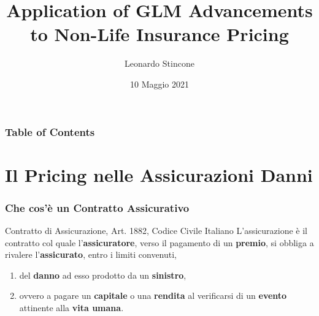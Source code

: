 \documentclass[pdf, aspectratio=169]{beamer}\usepackage[]{graphicx}\usepackage[]{color}
\title{Application of GLM Advancements \\ to Non-Life Insurance Pricing}
\author{Leonardo Stincone}
\date{10 Maggio 2021}
\institute[units]{Università degli Studi di Trieste}
\theoremstyle{definition}
\begin{document}
\begin{frame}
\titlepage
\end{frame}





\begin{frame}
\frametitle{Table of Contents}

\tableofcontents


\end{frame}


\section{Il Pricing nelle Assicurazioni Danni}


\begin{frame}
\frametitle{Che cos'è un Contratto Assicurativo}

\begin{block}{Contratto di Assicurazione, Art. 1882, Codice Civile Italiano}
  L'assicurazione è il contratto col quale l'{\bfseries assicuratore}, verso il pagamento di un {\bfseries premio}, si obbliga a rivalere l'{\bfseries assicurato}, entro i limiti convenuti,
  
  \begin{enumerate}
    \item del {\bfseries danno} ad esso prodotto da un {\bfseries sinistro},
    \item ovvero a pagare un {\bfseries capitale} o una {\bfseries rendita} al verificarsi di un {\bfseries evento} attinente alla {\bfseries vita umana}.
  \end{enumerate}
\end{block}

\end{frame}
\end{document}
